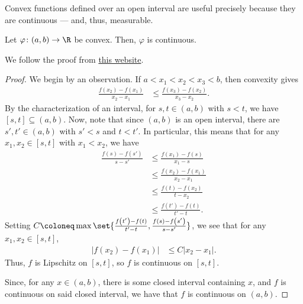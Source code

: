 \documentclass[10pt]{mypackage}
\begin{document}
Convex functions defined over an open interval are useful precisely because they are continuous --- and, thus, measurable.
\begin{theorem}
  Let $\varphi\colon (a,b)\rightarrow \R$ be convex. Then, $\varphi$ is continuous.
\end{theorem}
We follow the proof from \href{https://unapologetic.wordpress.com/2008/04/15/convex-functions-are-continuous/}{this website}.
\begin{proof}
  We begin by an observation. If $a < x_1 < x_2 < x_3 < b$, then convexity gives
  \begin{align*}
    \frac{f\left( x_2 \right)- f\left( x_1 \right)}{x_2 - x_1} &\leq \frac{f\left( x_3 \right)-f\left( x_2 \right)}{x_3 - x_2}. \label{eq:convexity_fraction_inequality}\tag{\textasteriskcentered}
  \end{align*}
  By the characterization of an interval, for $s , t\in \left( a,b \right)$ with $s < t$, we have $\left[ s,t \right]\subseteq \left( a,b \right)$. Now, note that since $\left( a,b \right)$ is an open interval, there are $s',t'\in \left( a,b \right)$ with $s' < s$ and $t < t'$. In particular, this means that for any $x_1,x_2\in \left[ s,t \right]$ with $x_1 < x_2$, we have
  \begin{align*}
    \frac{f\left( s \right) - f\left( s' \right)}{s-s'} &\leq \frac{f\left( x_1 \right) - f\left( s \right)}{x_1 - s}\\
                                                        &\leq \frac{f\left( x_2 \right) - f\left( x_1 \right)}{x_2 - x_1}\\
                                                        &\leq  \frac{f\left( t \right) - f\left( x_2 \right)}{t-x_2}\\
                                                        &\leq \frac{f\left( t' \right)-f\left( t \right)}{t'-t}.
  \end{align*}
  Setting $C\coloneq \max\set{\frac{f\left( t' \right)-f\left( t \right)}{t'-t},\frac{f\left( s \right)-f\left( s' \right)}{s-s'}}$, we see that for any $x_1,x_2\in \left[ s,t \right]$,
  \begin{align*}
    \left\vert f\left( x_2 \right)-f\left( x_1 \right) \right\vert &\leq C \left\vert x_2 - x_1 \right\vert.
  \end{align*}
  Thus, $f$ is Lipschitz on $\left[ s,t \right]$, so $f$ is continuous on $\left[ s,t \right]$.\newline

  Since, for any $x\in \left( a,b \right)$, there is some closed interval containing $x$, and $f$ is continuous on said closed interval, we have that $f$ is continuous on $\left( a,b \right)$.
\end{proof}
\end{document}
